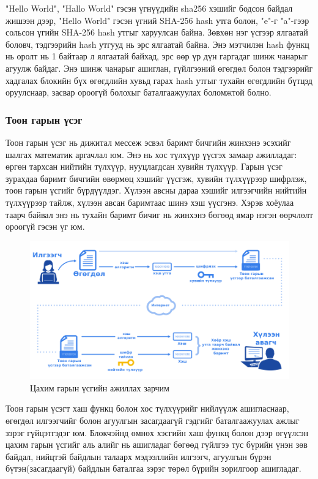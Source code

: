 "Hello World", "Hallo World" гэсэн үгнүүдийн sha256 хэшийг бодсон байдал жишээн дээр, "Hello World" гэсэн үгний SHA-256 hash утга болон, "e"-г "a"-гээр сольсон үгийн SHA-256 hash утгыг харуулсан байна. Зөвхөн нэг үсгээр ялгаатай боловч, тэдгээрийн hash утгууд нь эрс ялгаатай байна. Энэ мэтчилэн hash функц нь оролт нь 1 байтаар л ялгаатай байхад, эрс өөр үр дүн гаргадаг шинж чанарыг агуулж байдаг. Энэ шинж чанарыг ашиглан, гүйлгээний өгөгдөл болон тэдгээрийг хадгалах блокийн бүх өгөгдлийн хувьд гарах hash утгыг тухайн өгөгдлийн бүтцэд оруулснаар, засвар ороогүй болохыг баталгаажуулах боломжтой болно.

\subsubsection{Тоон гарын үсэг}
Тоон гарын үсэг нь дижитал мессеж эсвэл баримт бичгийн жинхэнэ эсэхийг шалгах математик аргачлал юм. Энэ нь хос түлхүүр үүсгэх замаар ажилладаг: өргөн тархсан нийтийн түлхүүр, нууцлагдсан хувийн түлхүүр. Гарын үсэг зурахдаа баримт бичгийн өвөрмөц хэшийг үүсгэж, хувийн түлхүүрээр шифрлэж, тоон гарын үсгийг бүрдүүлдэг. Хүлээн авсны дараа хэшийг илгээгчийн нийтийн түлхүүрээр тайлж, хүлээн авсан баримтаас шинэ хэш үүсгэнэ. Хэрэв хоёулаа таарч байвал энэ нь тухайн баримт бичиг нь жинхэнэ бөгөөд ямар нэгэн өөрчлөлт ороогүй гэсэн үг юм.

\begin{figure}[h!]
	\centering
	\includegraphics[scale=0.38]{src/images/dig-sign.png}
	\caption{Цахим гарын үсгийн ажиллах зарчим}
\end{figure}

\newpage
Тоон гарын үсэгт хаш функц болон хос түлхүүрийг нийлүүлж ашигласнаар, өгөгдөл илгээгчийг болон агуулгын засагдаагүй гэдгийг баталгаажуулах ажлыг зэрэг гүйцэтгэдэг юм. Блокчэйнд өмнөх хэсгийн хаш функц болон дээр өгүүлсэн цахим гарын үсгийг аль алийг нь ашигладаг бөгөөд гүйлгээ тус бүрийн үнэн зөв байдал, нийцтэй байдлын талаарх мэдээллийн илгээгч, агуулгын бүрэн бүтэн(засагдаагүй) байдлын баталгаа зэрэг төрөл бүрийн зорилгоор ашигладаг.

